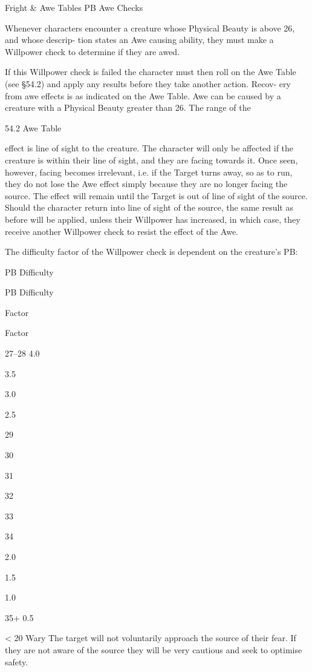 \begin{Chapter}{Fright \& Awe Tables}
PB Awe Checks 

Whenever  characters  encounter  a  creature  whose 
Physical  Beauty  is  above  26,  and  whose  descrip-
tion states an Awe causing ability, they must make 
a Willpower check to determine if they are awed. 

If this Willpower check is failed the character must 
then  roll  on  the  Awe  Table  (see  §54.2)  and  apply 
any results before they take another action. Recov-
ery  from  awe  effects  is  as  indicated  on  the  Awe 
Table.  Awe  can  be  caused  by  a  creature  with  a 
Physical  Beauty  greater  than  26.  The  range  of  the 

54.2 Awe Table 

effect is line of sight to the creature. The character 
will  only  be  affected  if  the  creature  is  within their 
line  of  sight,  and  they  are  facing  towards  it.  Once 
seen, however, facing becomes irrelevant, i.e. if the 
Target turns away, so as to run, they do not lose the 
Awe  effect  simply  because  they  are  no  longer 
facing  the  source.  The  effect  will  remain  until  the 
Target is out of line of sight of the source. Should 
the character return into line of sight of the source, 
the  same  result  as  before  will  be  applied,  unless 
their Willpower has increased, in which case, they 
receive another Willpower check to resist the effect 
of the Awe. 

The  difficulty  factor  of  the  Willpower  check  is 
dependent on the creature’s PB: 

PB   Difficulty  

PB  Difficulty  

Factor 

Factor 

27–28  4.0 

3.5 

3.0 

2.5 

29 

30 

31 

 

32 

33 

34 

2.0 

1.5 

1.0 

35+  0.5 

< 20   Wary The target will not voluntarily approach the source of their 
fear. If they are not aware of the source they will be very cautious 
and seek to optimise safety. 


\end{Chapter}
